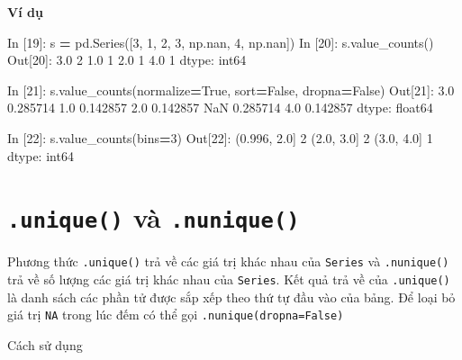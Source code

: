 \documentclass[
]{book}
\newenvironment{Shaded}{\begin{snugshade}}{\end{snugshade}}
\newcommand{\DecValTok}[1]{\textcolor[rgb]{0.00,0.00,0.81}{#1}}
\newcommand{\FloatTok}[1]{\textcolor[rgb]{0.00,0.00,0.81}{#1}}
\newcommand{\NormalTok}[1]{#1}
\newcommand{\OperatorTok}[1]{\textcolor[rgb]{0.81,0.36,0.00}{\textbf{#1}}}
\newcommand{\VariableTok}[1]{\textcolor[rgb]{0.00,0.00,0.00}{#1}}
\begin{document}
\textbf{Ví dụ}

\begin{Shaded}
\begin{Highlighting}[]
\NormalTok{In [}\DecValTok{19}\NormalTok{]: s }\OperatorTok{=}\NormalTok{ pd.Series([}\DecValTok{3}\NormalTok{, }\DecValTok{1}\NormalTok{, }\DecValTok{2}\NormalTok{, }\DecValTok{3}\NormalTok{,  np.nan, }\DecValTok{4}\NormalTok{, np.nan])}
\NormalTok{In [}\DecValTok{20}\NormalTok{]: s.value\_counts()}
\NormalTok{Out[}\DecValTok{20}\NormalTok{]: }
\FloatTok{3.0}    \DecValTok{2}
\FloatTok{1.0}    \DecValTok{1}
\FloatTok{2.0}    \DecValTok{1}
\FloatTok{4.0}    \DecValTok{1}
\NormalTok{dtype: int64}

\NormalTok{In [}\DecValTok{21}\NormalTok{]: s.value\_counts(normalize}\OperatorTok{=}\VariableTok{True}\NormalTok{, sort}\OperatorTok{=}\VariableTok{False}\NormalTok{, dropna}\OperatorTok{=}\VariableTok{False}\NormalTok{)}
\NormalTok{Out[}\DecValTok{21}\NormalTok{]:}
\FloatTok{3.0}    \FloatTok{0.285714}
\FloatTok{1.0}    \FloatTok{0.142857}
\FloatTok{2.0}    \FloatTok{0.142857}
\NormalTok{NaN    }\FloatTok{0.285714}
\FloatTok{4.0}    \FloatTok{0.142857}
\NormalTok{dtype: float64}

\NormalTok{In [}\DecValTok{22}\NormalTok{]: s.value\_counts(bins}\OperatorTok{=}\DecValTok{3}\NormalTok{)}
\NormalTok{Out[}\DecValTok{22}\NormalTok{]:}
\NormalTok{(}\FloatTok{0.996}\NormalTok{, }\FloatTok{2.0}\NormalTok{]    }\DecValTok{2}
\NormalTok{(}\FloatTok{2.0}\NormalTok{, }\FloatTok{3.0}\NormalTok{]      }\DecValTok{2}
\NormalTok{(}\FloatTok{3.0}\NormalTok{, }\FloatTok{4.0}\NormalTok{]      }\DecValTok{1}
\NormalTok{dtype: int64}
\end{Highlighting}
\end{Shaded}

\section{\texorpdfstring{\texttt{.unique()} và \texttt{.nunique()}}{.unique() và .nunique()}}\label{unique-vuxe0-.nunique}

Phương thức \texttt{.unique()} trả về các giá trị khác nhau của \texttt{Series} và \texttt{.nunique()} trả về số lượng các giá trị khác nhau của \texttt{Series}. Kết quả trả về của \texttt{.unique()} là danh sách các phần tử được sắp xếp theo thứ tự đầu vào của bảng. Để loại bỏ giá trị \texttt{NA} trong lúc đếm có thể gọi \texttt{.nunique(dropna=False)}

Cách sử dụng
\end{document}
